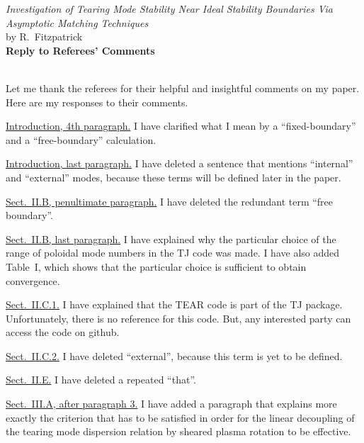 \documentclass{article}[12pt]
\begin{document}
\begin{center}
{\em  Investigation of  Tearing Mode Stability Near Ideal Stability Boundaries Via Asymptotic Matching Techniques}\\[1ex]
by R.~Fitzpatrick\\[1ex]
{\bf Reply to Referees' Comments}\\[1ex]
~
\end{center}
Let me thank the  referees for their helpful and insightful comments on my paper. Here are my responses to
their comments.

\begin{description}

\item \underline{Introduction, 4th paragraph.} I have clarified what I mean by a ``fixed-boundary'' and a ``free-boundary'' calculation. 

\item \underline{Introduction, last paragraph.} I have deleted a sentence that mentions ``internal'' and ``external'' modes, because these
terms will be defined later in the paper. 

\item \underline{Sect.~II.B, penultimate paragraph.}  I have deleted the redundant term ``free boundary''. 

\item \underline{Sect.~II.B, last paragraph.} I have explained why the particular choice of the range of poloidal mode numbers in the TJ code was made.
I have also added Table~I, which shows that the particular choice is sufficient to obtain convergence. 

\item \underline{Sect.~II.C.1.} I have explained that the TEAR code is part of the TJ package. Unfortunately, there is no reference for this code. But, any
interested party can access the code on github. 

\item \underline{Sect.~II.C.2.} I have deleted ``external'', because this term is yet to be defined. 

\item \underline{Sect.~II.E.} I have deleted a repeated ``that''. 

\item \underline{Sect.~III.A, after paragraph 3.} I have added a paragraph that explains more exactly the criterion that has to be satisfied in order for
the linear decoupling of the tearing mode dispersion relation by sheared plasma rotation to be effective. 


\end{description}
\end{document}
